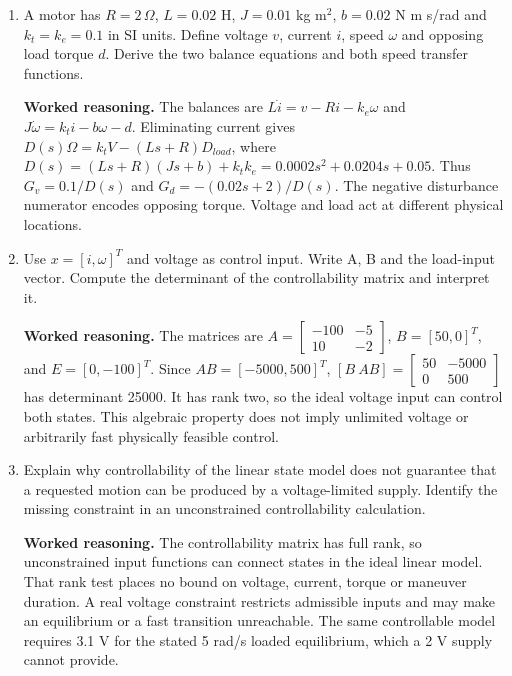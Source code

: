 \documentclass[10pt,a4paper]{article}
\newcommand{\answer}{\par\smallskip\textbf{Worked reasoning.} }
\begin{document}
\begin{enumerate}
\item A motor has $R=2\,\Omega$, $L=0.02$ H, $J=0.01$ kg m$^2$, $b=0.02$ N m s/rad and $k_t=k_e=0.1$ in SI units. Define voltage $v$, current $i$, speed $\omega$ and opposing load torque $d$. Derive the two balance equations and both speed transfer functions.
\answer The balances are $L\dot i=v-Ri-k_e\omega$ and $J\dot\omega=k_t i-b\omega-d$. Eliminating current gives $D(s)\Omega=k_t V-(Ls+R)D_{load}$, where $D(s)=(Ls+R)(Js+b)+k_tk_e=0.0002s^2+0.0204s+0.05$. Thus $G_v=0.1/D(s)$ and $G_d=-(0.02s+2)/D(s)$. The negative disturbance numerator encodes opposing torque. Voltage and load act at different physical locations.
\item Use $x=[i,\omega]^T$ and voltage as control input. Write A, B and the load-input vector. Compute the determinant of the controllability matrix and interpret it.
\answer The matrices are $A=\begin{bmatrix}-100&-5\\10&-2\end{bmatrix}$, $B=[50,0]^T$, and $E=[0,-100]^T$. Since $AB=[-5000,500]^T$, $[B\ AB]=\begin{bmatrix}50&-5000\\0&500\end{bmatrix}$ has determinant 25000. It has rank two, so the ideal voltage input can control both states. This algebraic property does not imply unlimited voltage or arbitrarily fast physically feasible control.
\item Explain why controllability of the linear state model does not guarantee that a requested motion can be produced by a voltage-limited supply. Identify the missing constraint in an unconstrained controllability calculation.
\answer The controllability matrix has full rank, so unconstrained input functions can connect states in the ideal linear model. That rank test places no bound on voltage, current, torque or maneuver duration. A real voltage constraint restricts admissible inputs and may make an equilibrium or a fast transition unreachable. The same controllable model requires 3.1 V for the stated 5 rad/s loaded equilibrium, which a 2 V supply cannot provide.
\end{enumerate}
\end{document}
